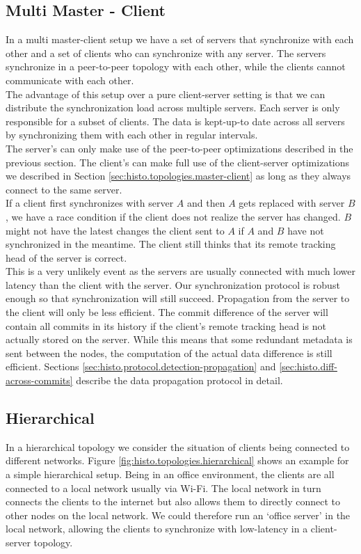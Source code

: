 \subsection{Multi Master - Client}
\label{sec:histo.topologies.multi-master}
In a multi master-client setup we have a set of servers that synchronize with each other and a set of clients who can synchronize with any server.
The servers synchronize in a peer-to-peer topology with each other, while the clients cannot communicate with each other.\\
The advantage of this setup over a pure client-server setting is that we can distribute the synchronization load across multiple servers.
Each server is only responsible for a subset of clients.
The data is kept-up-to date across all servers by synchronizing them with each other in regular intervals.\\
The server's can only make use of the peer-to-peer optimizations described in the previous section.
The client's can make full use of the client-server optimizations we described in Section \ref{sec:histo.topologies.master-client} as long as they always connect to the same server.\\
If a client first synchronizes with server $ A $ and then $ A $ gets replaced with server $ B $, we have a race condition if the client does not realize the server has changed.
$ B $ might not have the latest changes the client sent to $ A $ if $ A $ and $ B $ have not synchronized in the meantime.
The client still thinks that its remote tracking head of the server is correct.\\
This is a very unlikely event as the servers are usually connected with much lower latency than the client with the server.
Our synchronization protocol is robust enough so that synchronization will still succeed.
Propagation from the server to the client will only be less efficient.
The commit difference of the server will contain all commits in its history if the client's remote tracking head is not actually stored on the server.
While this means that some redundant metadata is sent between the nodes, the computation of the actual data difference is still efficient.
Sections \ref{sec:histo.protocol.detection-propagation} and \ref{sec:histo.diff-across-commits} describe the data propagation protocol in detail.

\subsection{Hierarchical}
In a hierarchical topology we consider the situation of clients being connected to different networks.
Figure \ref{fig:histo.topologies.hierarchical} shows an example for a simple hierarchical setup.
Being in an office environment, the clients are all connected to a local network usually via Wi-Fi.
The local network in turn connects the clients to the internet but also allows them to directly connect to other nodes on the local network.
We could therefore run an `office server' in the local network, allowing the clients to synchronize with low-latency in a client-server topology.\\

